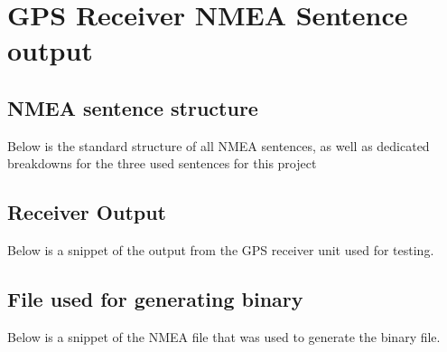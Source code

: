 
\chapter{GPS Receiver NMEA Sentence output} %

\label{AppendixB} %

\section{NMEA sentence structure}
Below is the standard structure of all NMEA sentences, as well as dedicated breakdowns for the three used sentences for this project

\section{Receiver Output}
Below is a snippet of the output from the GPS receiver unit used for testing.

\section{File used for generating binary}
Below is a snippet of the NMEA file that was used to generate the binary file.